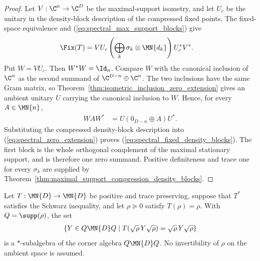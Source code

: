 \begin{proof}
    \leanok
    Let $V:\C^n\to\C^D$ be the maximal-support isometry, and let $U_c$ be
    the unitary in the density-block description of the compressed fixed
    points. The fixed-space equivalence and
    (\ref{eq:spectral_max_support_blocks}) give
    \begin{align}
        \Fix(T)
         & =VU_c\left(\bigoplus_k
        \sigma_k\otimes\MN{d_k}\right)U_c^*V^*.
        \notag
    \end{align}
    Put $W=VU_c$. Then $W^*W=\Id_n$. Compare $W$ with the canonical
    inclusion of $\C^n$ as the second summand of
    $\C^{D-n}\oplus\C^n$. The two inclusions have the same Gram matrix, so
    Theorem~\ref{thm:isometric_inclusion_zero_extension} gives an ambient
    unitary $U$ carrying the canonical inclusion to $W$. Hence, for every
    $A\in\MN{n}$,
    \begin{align}
        WAW^*
         & =U(0_{D-n}\oplus A)U^*.
        \label{eq:spectral_zero_extension}
    \end{align}
    Substituting the compressed density-block description into
    (\ref{eq:spectral_zero_extension}) proves
    (\ref{eq:spectral_fixed_density_blocks}). The first block is the whole
    orthogonal complement of the maximal stationary support, and is
    therefore one zero summand. Positive definiteness and trace one for
    every $\sigma_k$ are supplied by
    Theorem~\ref{thm:maximal_support_compression_density_blocks}.
\end{proof}

\begin{theorem}%
    \label{thm:abstract_weighted_corner_fixed_points}
    \leanok
    Let $T:\MN{D}\to\MN{D}$ be positive and trace preserving, suppose that
    $T^*$ satisfies the Schwarz inequality, and let $\rho\succeq0$ satisfy
    $T(\rho)=\rho$.  With $Q=\supp(\rho)$, the set
    \begin{align}
        \left\{Y\in Q\MN{D}Q\;\middle|\;
          T\!\left(\sqrt{\rho}\,Y\sqrt{\rho}\right)
          =\sqrt{\rho}\,Y\sqrt{\rho}\right\}
        \label{eq:spectral_weighted_corner_fixed_points}
    \end{align}
    is a $*$-subalgebra of the corner algebra $Q\MN{D}Q$.
    No invertibility of $\rho$ on the ambient space is assumed.
\end{theorem}

